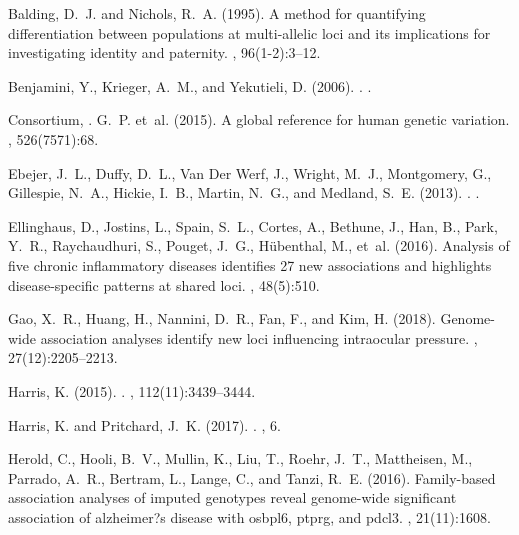 \documentclass[9pt,article]{template}
\begin{document}
\begin{thebibliography}{}
Balding, D.~J. and Nichols, R.~A. (1995).
\newblock A method for quantifying differentiation between populations at
  multi-allelic loci and its implications for investigating identity and
  paternity.
, 96(1-2):3--12.

Benjamini, Y., Krieger, A.~M., and Yekutieli, D. (2006).
.
.

Consortium, . G.~P. et~al. (2015).
\newblock A global reference for human genetic variation.
, 526(7571):68.

Ebejer, J.~L., Duffy, D.~L., {Van Der Werf}, J., Wright, M.~J., Montgomery, G.,
  Gillespie, N.~A., Hickie, I.~B., Martin, N.~G., and Medland, S.~E. (2013).
.
.

Ellinghaus, D., Jostins, L., Spain, S.~L., Cortes, A., Bethune, J., Han, B.,
  Park, Y.~R., Raychaudhuri, S., Pouget, J.~G., H{\"u}benthal, M., et~al.
  (2016).
\newblock Analysis of five chronic inflammatory diseases identifies 27 new
  associations and highlights disease-specific patterns at shared loci.
, 48(5):510.

Gao, X.~R., Huang, H., Nannini, D.~R., Fan, F., and Kim, H. (2018).
\newblock Genome-wide association analyses identify new loci influencing
  intraocular pressure.
, 27(12):2205--2213.

Harris, K. (2015).
.
,
  112(11):3439--3444.

Harris, K. and Pritchard, J.~K. (2017).
.
, 6.

Herold, C., Hooli, B.~V., Mullin, K., Liu, T., Roehr, J.~T., Mattheisen, M.,
  Parrado, A.~R., Bertram, L., Lange, C., and Tanzi, R.~E. (2016).
\newblock Family-based association analyses of imputed genotypes reveal
  genome-wide significant association of alzheimer?s disease with osbpl6,
  ptprg, and pdcl3.
, 21(11):1608.


\end{thebibliography}
\end{document}
